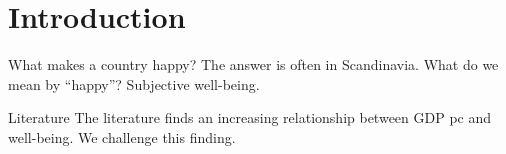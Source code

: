 \documentclass[aspectratio=169,xcolor=dvipsnames, 11pt,mathserif]{beamer}
\begin{document}

\section{Introduction}

\begin{frame}{What makes a country happy?}
    \bbvsp
    \ip {}
    \ip The answer is often in Scandinavia. %
    \ip What do we mean by ``happy''? \pause Subjective well-being.
    \ee
\end{frame}

\begin{frame}{Literature}
    \bbvsp
    \ip The literature finds an increasing relationship between GDP pc and well-being.%
    \ip We challenge this finding.
    \ee
\end{frame}
\end{document}
